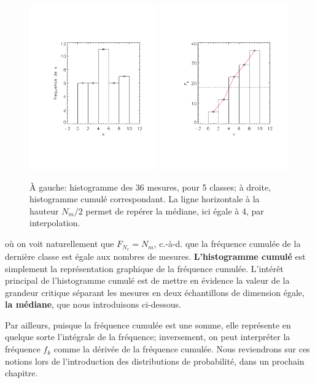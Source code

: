 \begin{figure}[h]
   \centering
   \includegraphics[width=5.5cm]{assets/figures/hist5classes.pdf}\hspace{5mm}
   \includegraphics[width=5.5cm]{assets/figures/histCumul5classes.pdf}
   \caption{À gauche: histogramme des 36 mesures, pour 5 classes; à droite, histogramme cumulé correspondant. La ligne horizontale à la hauteur $N_m/2$ permet de repérer la médiane, ici égale à 4, par interpolation.}
   \label{fig:hcapoabdc}
\end{figure}
où on voit naturellement que $F_{N_c}=N_m$, c.-à-d. que la fréquence cumulée de la dernière classe est égale aux nombres de mesures. \textbf{L'histogramme cumulé} est simplement la représentation graphique de la fréquence cumulée. L'intérêt principal de l'histogramme cumulé est de mettre en évidence la valeur de la grandeur critique séparant les mesures en deux échantillons de dimension égale, \textbf{la médiane}, que nous introduisons ci-dessous.

Par ailleurs, puisque la fréquence cumulée est une somme, elle représente en quelque sorte l'intégrale de la fréquence; inversement, on peut interpréter la fréquence $f_k$ comme la dérivée de la fréquence cumulée. Nous reviendrons sur ces notions lors de l'introduction des distributions de probabilité, dans un prochain chapitre.

